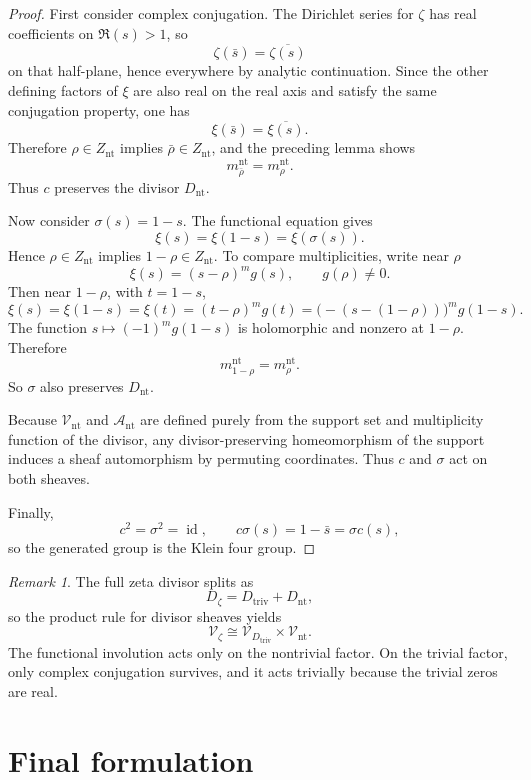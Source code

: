 \documentclass[11pt,a4paper]{article}
\theoremstyle{definition}
\theoremstyle{remark}
\newtheorem{remark}[theorem]{Remark}
\begin{document}
\begin{proof}
First consider complex conjugation. The Dirichlet series for \(\zeta\) has real coefficients on \(\Re(s)>1\), so
\[
\zeta(\bar s)=\overline{\zeta(s)}
\]
on that half-plane, hence everywhere by analytic continuation. Since the other defining factors of \(\xi\) are also real on the real axis and satisfy the same conjugation property, one has
\[
\xi(\bar s)=\overline{\xi(s)}.
\]
Therefore \(\rho\in Z_{\mathrm{nt}}\) implies \(\bar\rho\in Z_{\mathrm{nt}}\), and the preceding lemma shows
\[
m^{\mathrm{nt}}_{\bar\rho}=m^{\mathrm{nt}}_\rho.
\]
Thus \(c\) preserves the divisor \(D_{\mathrm{nt}}\).

Now consider \(\sigma(s)=1-s\). The functional equation gives
\[
\xi(s)=\xi(1-s)=\xi(\sigma(s)).
\]
Hence \(\rho\in Z_{\mathrm{nt}}\) implies \(1-\rho\in Z_{\mathrm{nt}}\). To compare multiplicities, write near \(\rho\)
\[
\xi(s)=(s-\rho)^m g(s),
\qquad
g(\rho)\ne0.
\]
Then near \(1-\rho\), with \(t=1-s\),
\[
\xi(s)=\xi(1-s)=\xi(t)=(t-\rho)^m g(t)=\bigl(-(s-(1-\rho))\bigr)^m g(1-s).
\]
The function \(s\mapsto(-1)^m g(1-s)\) is holomorphic and nonzero at \(1-\rho\). Therefore
\[
m^{\mathrm{nt}}_{1-\rho}=m^{\mathrm{nt}}_\rho.
\]
So \(\sigma\) also preserves \(D_{\mathrm{nt}}\).

Because \(\mathcal V_{\mathrm{nt}}\) and \(\mathcal A_{\mathrm{nt}}\) are defined purely from the support set and multiplicity function of the divisor, any divisor-preserving homeomorphism of the support induces a sheaf automorphism by permuting coordinates. Thus \(c\) and \(\sigma\) act on both sheaves.

Finally,
\[
c^2=\sigma^2=\operatorname{id},
\qquad
c\sigma(s)=1-\bar s=\sigma c(s),
\]
so the generated group is the Klein four group.
\end{proof}

\begin{remark}
The full zeta divisor splits as
\[
D_\zeta=D_{\mathrm{triv}}+D_{\mathrm{nt}},
\]
so the product rule for divisor sheaves yields
\[
\mathcal V_\zeta\cong \mathcal V_{D_{\mathrm{triv}}}\times \mathcal V_{\mathrm{nt}}.
\]
The functional involution acts only on the nontrivial factor. On the trivial factor, only complex conjugation survives, and it acts trivially because the trivial zeros are real.
\end{remark}

\section{Final formulation}
\end{document}
